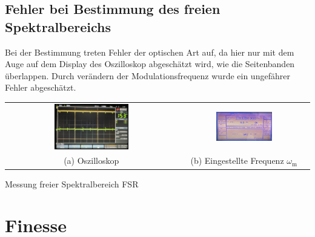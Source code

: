 \subsection*{Fehler bei Bestimmung des freien Spektralbereichs}

Bei der Bestimmung treten Fehler der optischen Art auf, da hier nur mit dem Auge auf dem Display des Oszilloskop abgeschätzt wird, wie die Seitenbanden überlappen. Durch verändern der Modulationsfrequenz wurde ein ungefährer Fehler abgeschätzt.

\begin{center}
    \captionsetup{type=figure}
    \begin{tabular}{c c}
        \includegraphics[width=0.45\textwidth]{Bilder/FSR/fsr_oszi.jpg} & \includegraphics[width=0.45\textwidth]{Bilder/FSR/fsr_hf-generator.jpg} \\
        (a) Oszilloskop & (b) Eingestellte Frequenz  $\omega_\mathrm{m}$
    \end{tabular}
    \caption{Messung freier Spektralbereich FSR}
    \label{fig:specBereich}
\end{center}

\newpage
\section{Finesse}
\label{sec:finess}

